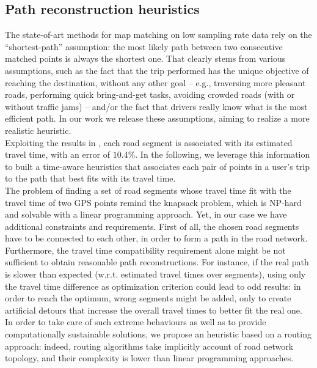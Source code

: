 \documentclass[5p]{elsarticle}
\begin{document}
\subsection{Path reconstruction heuristics}

The state-of-art methods for map matching on low sampling rate data rely on the ``shortest-path'' assumption: the most likely path between two consecutive matched points is always the shortest one. 
That clearly stems from various assumptions, such as the fact that the trip performed has the unique objective of reaching the destination, without any other goal -- e.g., traversing more pleasant roads, performing quick bring-and-get tasks, avoiding crowded roads (with or without traffic jams) -- and/or the fact that drivers really know what is the most efficient path. 
In our work we release these assumptions, aiming to realize a more realistic heuristic. \\
Exploiting the results in \cite{cintia2013gravity}, each road segment is associated with its estimated travel time, with an error of $10.4\%$. 
In the following, we leverage this information to built a time-aware heuristics that associates each pair of points in a user's trip to the path that best fits with its travel time. \\

The problem of finding a set of road segments whose travel time fit with the travel time of two GPS points remind the knapsack problem, which is NP-hard and solvable with a linear programming approach. 
Yet, in our case we have additional constraints and requirements. First of all, the chosen road segments have to be connected to each other, in order to form a path in the road network. 
Furthermore, the travel time compatibility requirement alone might be not sufficient to obtain reasonable path reconstructions. For instance, if the real path is slower than expected (w.r.t. estimated travel times over segments), using only the travel time difference as optimization criterion
could lead to odd results: in order to reach the optimum, wrong segments might be added, only to create artificial detours that increase the overall travel times to better fit the real one. 
In order to take care of such extreme behaviours as well as to provide computationally sustainable solutions, we propose an heuristic based on a routing approach: 
indeed, routing algorithms take implicitly account of road network topology, and their complexity is lower than linear programming approaches.\\
\end{document}
